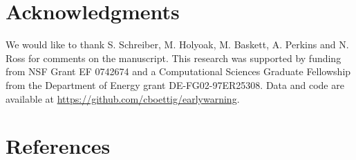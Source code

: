 \documentclass[authoryear,review,11pt]{elsarticle}
\begin{document}
\section{Acknowledgments}
We would like to thank S. Schreiber, M. Holyoak, M. Baskett, A. Perkins and N. Ross for comments on the manuscript. 
This research was supported by funding from NSF Grant EF 0742674 
and a Computational Sciences Graduate Fellowship from the Department of Energy grant DE-FG02-97ER25308. 
Data and code are available at \href{https://github.com/cboettig/earlywarning}{ https://github.com/cboettig/earlywarning}.




\section{References}%

%
 
\end{document}
